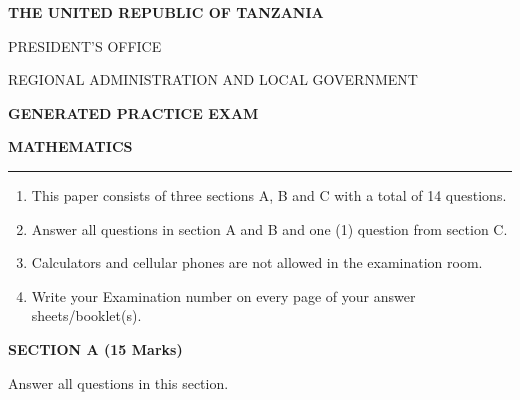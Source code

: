\documentclass[12pt]{article}
\newcommand{\leftheading}[1]{
    \noindent{\fontsize{12}{14}\selectfont\bfseries #1}\par
}
\newcommand{\centerheading}[1]{
    \vspace{0.6em}
    \begin{center}
        {\fontsize{13}{15}\selectfont\bfseries #1}
    \end{center}
    \vspace{0.15em}
}
\begin{document}
\begin{center}
  {\fontsize{14}{16}\selectfont\bfseries THE UNITED REPUBLIC OF TANZANIA\par}
  \vspace{0.2em}
  {\fontsize{12}{14}\selectfont PRESIDENT’S OFFICE\par}
  {\fontsize{12}{14}\selectfont REGIONAL ADMINISTRATION AND LOCAL GOVERNMENT\par}
  \vspace{0.35em}
  {\fontsize{14}{16}\selectfont\bfseries GENERATED PRACTICE EXAM\par}
  {\fontsize{14}{16}\selectfont\bfseries MATHEMATICS\par}
\end{center}
\vspace{0.6em}
\vspace{0.8em}

\vspace{-1.0em}
\noindent\rule{\textwidth}{0.4pt}
\vspace{-1.0em}

\leftheading{INSTRUCTIONS}
\begin{enumerate}[itemsep=0pt, topsep=2pt, parsep=0pt, partopsep=0pt]
  \item This paper consists of three sections A, B and C with a total of 14 questions.
  \item Answer all questions in section A and B and one (1) question from section C.
  \item Calculators and cellular phones are not allowed in the examination room.
  \item Write your Examination number on every page of your answer sheets/booklet(s).
\end{enumerate}

\centerheading{SECTION A (15 Marks)}
\vspace{-2.0em}
\begin{center}
  Answer all questions in this section.
\end{center}
\end{document}

